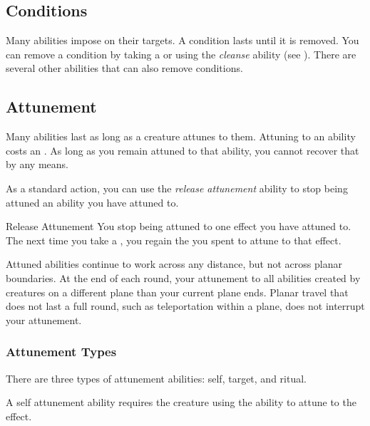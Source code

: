         \subsection{Conditions}\label{Conditions}
            Many abilities impose  on their targets.
            A condition lasts until it is removed.
            You can remove a condition by taking a  or using the \textit{cleanse} ability (see ).
            There are several other abilities that can also remove conditions.

        \subsection{Attunement}\label{Attunement}
            Many abilities last as long as a creature attunes to them.
            Attuning to an ability costs an .
            As long as you remain attuned to that ability, you cannot recover that  by any means.

            As a standard action, you can use the \textit{release attunement} ability to stop being attuned an ability you have attuned to.
            \begin{freeability}{Release Attunement}
                You stop being attuned to one effect you have attuned to.
                The next time you take a , you regain the  you spent to attune to that effect.
            \end{freeability}

            Attuned abilities continue to work across any distance, but not across planar boundaries.
            At the end of each round, your attunement to all abilities created by creatures on a different plane than your current plane ends.
            Planar travel that does not last a full round, such as teleportation within a plane, does not interrupt your attunement.

            \subsubsection{Attunement Types}\label{Attunement Types}
                There are three types of attunement abilities: self, target, and ritual.

                 A self attunement ability requires the creature using the ability to attune to the effect.

